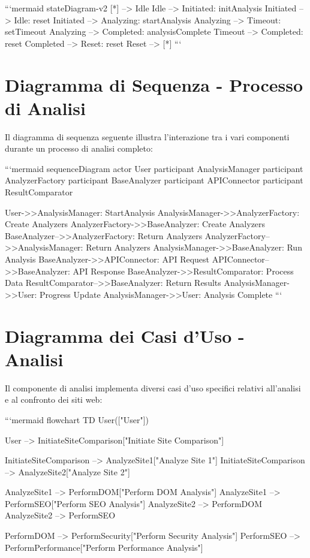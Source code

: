 ```mermaid
stateDiagram-v2
    [*] --> Idle
    Idle --> Initiated: initAnalysis
    Initiated --> Idle: reset
    Initiated --> Analyzing: startAnalysis
    Analyzing --> Timeout: setTimeout
    Analyzing --> Completed: analysisComplete
    Timeout --> Completed: reset
    Completed --> Reset: reset
    Reset --> [*]
```

\section{Diagramma di Sequenza - Processo di Analisi}
Il diagramma di sequenza seguente illustra l'interazione tra i vari componenti durante un processo di analisi completo:

```mermaid
sequenceDiagram
    actor User
    participant AnalysisManager
    participant AnalyzerFactory
    participant BaseAnalyzer
    participant APIConnector
    participant ResultComparator
    
    User->>AnalysisManager: StartAnalysis
    AnalysisManager->>AnalyzerFactory: Create Analyzers
    AnalyzerFactory->>BaseAnalyzer: Create Analyzers
    BaseAnalyzer-->>AnalyzerFactory: Return Analyzers
    AnalyzerFactory-->>AnalysisManager: Return Analyzers
    AnalysisManager->>BaseAnalyzer: Run Analysis
    BaseAnalyzer->>APIConnector: API Request
    APIConnector-->>BaseAnalyzer: API Response
    BaseAnalyzer->>ResultComparator: Process Data
    ResultComparator-->>BaseAnalyzer: Return Results
    AnalysisManager->>User: Progress Update
    AnalysisManager->>User: Analysis Complete
```

\section{Diagramma dei Casi d'Uso - Analisi}
Il componente di analisi implementa diversi casi d'uso specifici relativi all'analisi e al confronto dei siti web:

```mermaid
flowchart TD
    User(["User"])
    
    User --> InitiateSiteComparison["Initiate Site Comparison"]
    
    InitiateSiteComparison --> AnalyzeSite1["Analyze Site 1"]
    InitiateSiteComparison --> AnalyzeSite2["Analyze Site 2"]
    
    AnalyzeSite1 --> PerformDOM["Perform DOM Analysis"]
    AnalyzeSite1 --> PerformSEO["Perform SEO Analysis"]
    AnalyzeSite2 --> PerformDOM
    AnalyzeSite2 --> PerformSEO
    
    PerformDOM --> PerformSecurity["Perform Security Analysis"]
    PerformSEO --> PerformPerformance["Perform Performance Analysis"]
    
